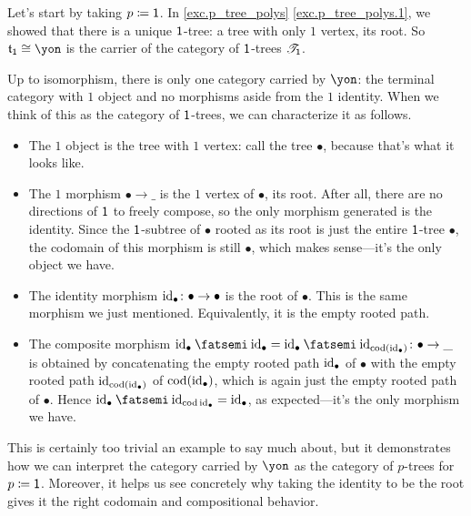 \documentclass[Book-Poly]{subfiles}
\begin{document}
\begin{example}
Let's start by taking $p\coloneqq\textsf{1}$.
In \cref{exc.p_tree_polys} \cref{exc.p_tree_polys.1}, we showed that there is a unique $\textsf{1}$-tree: a tree with only $1$ vertex, its root.
So $\car{t}_\1\iso\yon$ is the carrier of the category of $\textsf{1}$-trees $\mathscr{T}_{\textsf{1}}$.

Up to isomorphism, there is only one category carried by $\yon$: the terminal category with $1$ object and no morphisms aside from the $1$ identity.
When we think of this as the category of $\textsf{1}$-trees, we can characterize it as follows.
\begin{itemize}
    \item The $1$ object is the tree with $1$ vertex: call the tree $\bullet$, because that's what it looks like.
    \item The $1$ morphism $\bullet\to\_$ is the $1$ vertex of $\bullet$, its root.
    After all, there are no directions of $\textsf{1}$ to freely compose, so the only morphism generated is the identity.
    Since the $\textsf{1}$-subtree of $\bullet$ rooted as its root is just the entire $\textsf{1}$-tree $\bullet$, the codomain of this morphism is still $\bullet$, which makes sense---it's the only object we have.
    \item The identity morphism $\mathrm{id}_\bullet\colon\bullet\to\bullet$ is the root of $\bullet$.
    This is the same morphism we just mentioned.
    Equivalently, it is the empty rooted path.
    \item The composite morphism $\id_\bullet\then\id_\bullet=\id_\bullet\then\id_{\cod(\id_\bullet)}\colon\bullet\to\_$ is obtained by concatenating the empty rooted path $\mathrm{id}_\bullet$ of $\bullet$ with the empty rooted path $\mathrm{id}_{\operatorname{cod}(\mathrm{id}_\bullet)}$ of $\operatorname{cod}(\mathrm{id}_\bullet)$, which is again just the empty rooted path of $\bullet$.
    Hence $\id_\bullet\then\id_{\cod\id_\bullet}=\id_\bullet$, as expected---it's the only morphism we have.
\end{itemize}
This is certainly too trivial an example to say much about, but it demonstrates how we can interpret the category carried by $\yon$ as the category of $p$-trees for $p\coloneqq\textsf{1}$.
Moreover, it helps us see concretely why taking the identity to be the root gives it the right codomain and compositional behavior.

\end{example}
\end{document}
